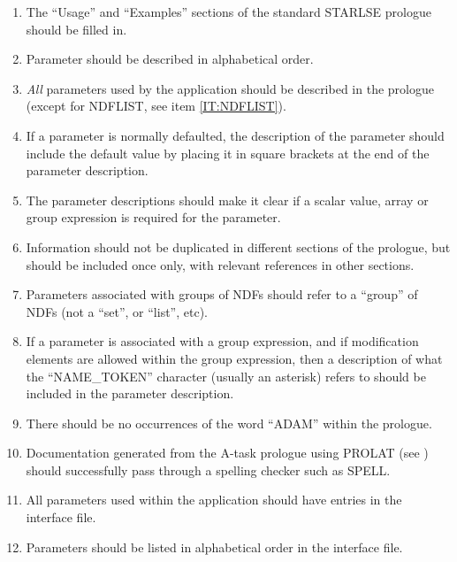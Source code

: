 \begin{enumerate}
\item The ``Usage'' and ``Examples'' sections of the standard {\small STARLSE}
prologue should be filled in. 

\item Parameter should be described in alphabetical order.

\item {\em All} parameters used by the application should be described in the 
prologue (except for {\small NDFLIST}, see item \ref{IT:NDFLIST}).

\item If a parameter is normally defaulted, the description of the parameter
should include the default value by placing it in square brackets at the end of
the parameter description. 

\item The parameter descriptions should make it clear if a scalar value, array 
or group expression is required for the parameter.

\item Information should not be duplicated in different sections of the 
prologue, but should be included once only, with relevant references in other 
sections.

\item Parameters associated with groups of {\small NDF}s should refer to a 
``group'' of {\small NDF}s (not a ``set'', or ``list'', etc).

\item If a parameter is associated with a group expression, and if modification
elements are allowed within the group expression, then a description of what the
``{\small NAME\_TOKEN}'' character (usually an asterisk) refers to should be
included in the parameter description. 

\item There should be no occurrences of the word ``{\small ADAM}'' within the 
prologue.

\item Documentation generated from the A-task prologue using {\small PROLAT}
(see ) should successfully pass through a spelling
checker such as {\small SPELL}.

\item All parameters used within the application should have entries in the 
interface file.

\item Parameters should be listed in alphabetical order in the interface file.


\end{enumerate}

